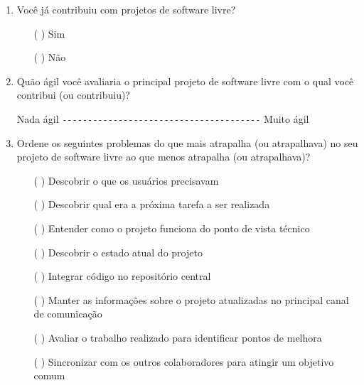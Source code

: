 \begin{enumerate}
\item Você já contribuiu com projetos de software livre?
  \begin{itemize}
  \item[( )] Sim
  \item[( )] Não
  \end{itemize}

\item Quão ágil você avaliaria o principal projeto de software livre
  com o qual você contribui (ou contribuiu)?

  Nada ágil \verb=---------------------------------------= Muito ágil

\item Ordene os seguintes problemas do que mais atrapalha (ou
  atrapalhava) no seu projeto de software livre ao que menos
  atrapalha (ou atrapalhava)?
  \begin{itemize}
  \item[( )] Descobrir o que os usuários precisavam
  \item[( )] Descobrir qual era a próxima tarefa a ser realizada
  \item[( )] Entender como o projeto funciona do ponto de vista técnico
  \item[( )] Descobrir o estado atual do projeto
  \item[( )] Integrar código no repositório central
  \item[( )] Manter as informações sobre o projeto atualizadas no
    principal canal de comunicação
  \item[( )] Avaliar o trabalho realizado para identificar pontos de
    melhora
  \item[( )] Sincronizar com os outros colaboradores para atingir um
    objetivo comum
  \end{itemize}


\end{enumerate}
